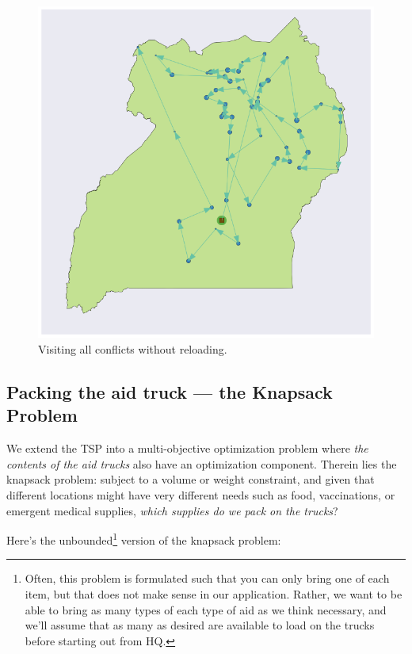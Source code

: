 \documentclass{article} %
\begin{document}
\begin{figure}
  \centering
  \includegraphics[width=\textwidth]{figures/routing-vanilla-tsp}
  \caption{Visiting all conflicts without reloading.}
  \label{fig:routing-vanilla-tsp}
\end{figure}

\subsection{Packing the aid truck --- the Knapsack Problem}

We extend the TSP into a multi-objective optimization problem
where \emph{the contents of the aid trucks} also have an optimization component. Therein lies
the knapsack problem: subject to a volume or weight constraint, and given that different locations
might have very different needs such as food, vaccinations, or emergent medical supplies, \emph{which
supplies do we pack on the trucks}?

Here's the unbounded\footnote{Often, this problem is formulated such that you can only bring one of each item, but that does not make sense in our application. Rather, we want to be able to bring as many types of each type of aid as we think necessary, and we'll assume that as many as desired are available to load on the trucks before starting out from HQ.} version of the knapsack problem:
\end{document}
